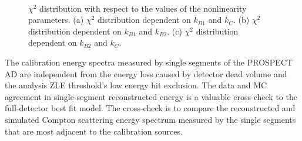 \begin{figure}[h!]
\centering
{}\quad
{} \\
\caption[$\chi^2$ distributions with respect to the values of nonlinearity parameters.]{$\chi^2$ distribution with respect to the values of the nonlinearity parameters.
(a) $\chi^2$ distribution dependent on $k_{B1}$ and $k_{C}$.
(b) $\chi^2$ distribution dependent on $k_{B1}$ and $k_{B2}$.
(c) $\chi^2$ distribution dependent on $k_{B2}$ and $k_{C}$.}
\label{fig:chi2}
\end{figure}
\newpage
\clearpage

\label{sec:single}
The calibration energy spectra measured by single segments of the PROSPECT AD are independent from the energy loss caused by detector dead volume and the analysis ZLE threshold's low energy hit exclusion.
The data and MC agreement in single-segment reconstructed energy is a valuable cross-check to the full-detector best fit model.
The cross-check is to compare the reconstructed and simulated Compton scattering energy spectrum measured by the single segments that are most adjacent to the calibration sources.

